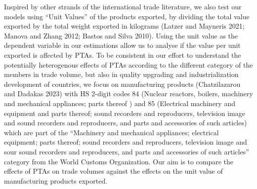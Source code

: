 Inspired by other strands of the international trade literature, we also
test our models using ``Unit Values'' of the products exported, by
dividing the total value exported by the total weight exported in
kilograms (Latzer and Mayneris 2021; Manova and Zhang 2012; Bastos and
Silva 2010). Using the unit value as the dependent variable in our
estimations allow us to analyse if the value per unit exported is
affected by PTAs. To be consistent in our effort to understand the
potentially heterogenous effects of PTAs according to the different
category of the members in trade volume, but also in quality upgrading
and industrialization development of countries, we focus on
manufacturing products (Chatzilazarou and Dadakas 2023) with HS 2-digit
codes 84 (Nuclear reactors, boilers, machinery and mechanical
appliances; parts thereof ) and 85 (Electrical machinery and equipment
and parts thereof; sound recorders and reproducers, television image and
sound recorders and reproducers, and parts and accessories of such
articles) which are part of the ``Machinery and mechanical appliances;
electrical equipment; parts thereof; sound recorders and reproducers,
television image and sour sound recorders and reproducers, and parts and
accessories of such articles'' category from the World Customs
Organization. Our aim is to compare the effects of PTAs on trade volumes
against the effects on the unit value of manufacturing products
exported.